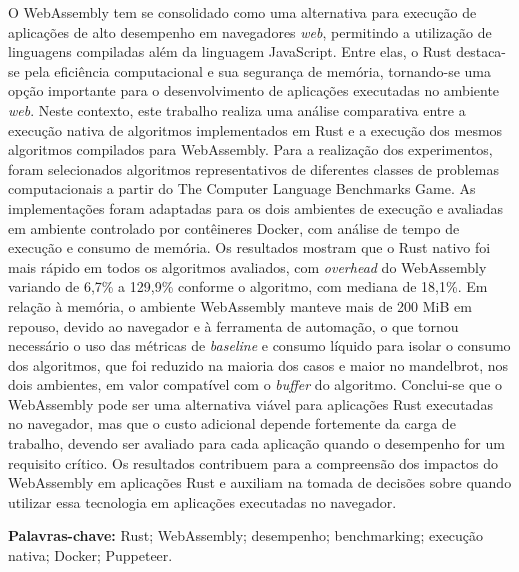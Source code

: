 O WebAssembly tem se consolidado como uma alternativa para execução de aplicações de alto desempenho em navegadores \emph{web}, permitindo a utilização de linguagens compiladas além da linguagem JavaScript. Entre elas, o Rust destaca-se pela eficiência computacional e sua segurança de memória, tornando-se uma opção importante para o desenvolvimento de aplicações executadas no ambiente \emph{web}. Neste contexto, este trabalho realiza uma análise comparativa entre a execução nativa de algoritmos implementados em Rust e a execução dos mesmos algoritmos compilados para WebAssembly. Para a realização dos experimentos, foram selecionados algoritmos representativos de diferentes classes de problemas computacionais a partir do The Computer Language Benchmarks Game. As implementações foram adaptadas para os dois ambientes de execução e avaliadas em ambiente controlado por contêineres Docker, com análise de tempo de execução e consumo de memória. Os resultados mostram que o Rust nativo foi mais rápido em todos os algoritmos avaliados, com \emph{overhead} do WebAssembly variando de 6,7\% a 129,9\% conforme o algoritmo, com mediana de 18,1\%. Em relação à memória, o ambiente WebAssembly manteve mais de 200 MiB em repouso, devido ao navegador e à ferramenta de automação, o que tornou necessário o uso das métricas de \emph{baseline} e consumo líquido para isolar o consumo dos algoritmos, que foi reduzido na maioria dos casos e maior no mandelbrot, nos dois ambientes, em valor compatível com o \emph{buffer} do algoritmo. Conclui-se que o WebAssembly pode ser uma alternativa viável para aplicações Rust executadas no navegador, mas que o custo adicional depende fortemente da carga de trabalho, devendo ser avaliado para cada aplicação quando o desempenho for um requisito crítico. Os resultados contribuem para a compreensão dos impactos do WebAssembly em aplicações Rust e auxiliam na tomada de decisões sobre quando utilizar essa tecnologia em aplicações executadas no navegador.

\textbf{Palavras-chave:} Rust; WebAssembly; desempenho; benchmarking; execução nativa; Docker; Puppeteer.
